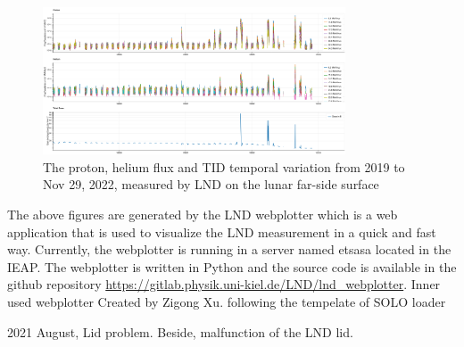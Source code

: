 \begin{figure}
    \centering
    \includegraphics[angle = 90, width =0.8\textwidth, height = \textheight]{images/LND-proton-helium-TID.png}
    \caption[The overview of proton, helium flux and \ac{TID} measured by \ac{LND}]{The proton, helium flux and \ac{TID} temporal variation from 2019 to Nov 29, 2022, measured by \ac{LND} on the lunar far-side surface}
    \label{Fig:appendix_LND_proton_helium_TID}
\end{figure}
\clearpage
The above figures are generated by the LND webplotter which is a web application that is used to visualize the LND measurement in a quick and fast way. 
Currently, the webplotter is running in a server named etsasa located in the IEAP.
The webplotter is written in Python and the source code is available in the github repository \url{https://gitlab.physik.uni-kiel.de/LND/lnd_webplotter}. 
Inner used webplotter 
Created by Zigong Xu. following the tempelate of SOLO loader

2021 August, Lid problem. Beside, malfunction of the LND lid.

